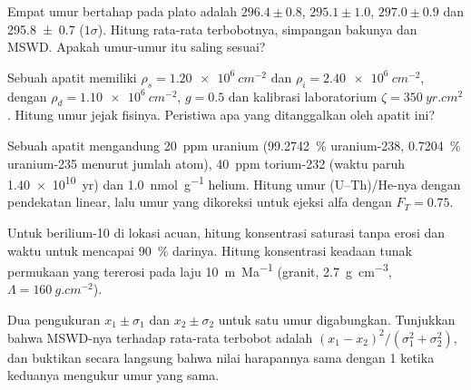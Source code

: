 \begin{exercise}[$\star\star$]\label{exo:b3:advanced-geochronology:6}
Empat umur bertahap pada plato adalah $296.4 \pm 0.8$, $295.1 \pm 1.0$, $297.0 \pm
0.9$ dan \qty[separate-uncertainty=true]{295.8 \pm 0.7}{\Ma} ($1\sigma$). Hitung rata-rata terbobotnya,
simpangan bakunya dan MSWD. Apakah umur-umur itu saling sesuai?
\end{exercise}

\begin{exercise}[$\star\star$]\label{exo:b3:advanced-geochronology:7}
Sebuah apatit memiliki $\rho_s = \qty{1.20e6}{cm^{-2}}$ dan $\rho_i =
\qty{2.40e6}{cm^{-2}}$, dengan $\rho_d = \qty{1.10e6}{cm^{-2}}$, $g = 0.5$ dan
kalibrasi laboratorium $\zeta = \qty{350}{yr.cm^2}$. Hitung umur jejak
fisinya. Peristiwa apa yang ditanggalkan oleh apatit ini?
\end{exercise}

\begin{exercise}[$\star\star$]\label{exo:b3:advanced-geochronology:8}
Sebuah apatit mengandung \qty{20}{ppm} uranium (\qty{99.2742}{\percent}
uranium-238, \qty{0.7204}{\percent} uranium-235 menurut jumlah atom), \qty{40}{ppm}
torium-232 (waktu paruh \qty{1.40e10}{yr}) dan \qty{1.0}{nmol.g^{-1}} helium.
Hitung umur (U--Th)/He-nya dengan pendekatan linear, lalu umur
yang dikoreksi untuk ejeksi alfa dengan $F_T = 0.75$.
\end{exercise}

\begin{exercise}[$\star\star$]\label{exo:b3:advanced-geochronology:9}
Untuk berilium-10 di lokasi acuan, hitung konsentrasi saturasi
tanpa erosi dan waktu untuk mencapai \qty{90}{\percent} darinya. Hitung
konsentrasi keadaan tunak permukaan yang tererosi pada laju \qty{10}{m.Ma^{-1}} (granit,
\qty{2.7}{g.cm^{-3}}, $\Lambda = \qty{160}{g.cm^{-2}}$).
\end{exercise}

\begin{exercise}[$\star\star\star$]\label{exo:b3:advanced-geochronology:10}
Dua pengukuran $x_1 \pm \sigma_1$ dan $x_2 \pm \sigma_2$ untuk satu umur
digabungkan. Tunjukkan bahwa MSWD-nya terhadap rata-rata terbobot adalah
$(x_1 - x_2)^2/(\sigma_1^2 + \sigma_2^2)$, dan buktikan secara langsung bahwa
nilai harapannya sama dengan 1 ketika keduanya mengukur umur yang sama.
\end{exercise}

